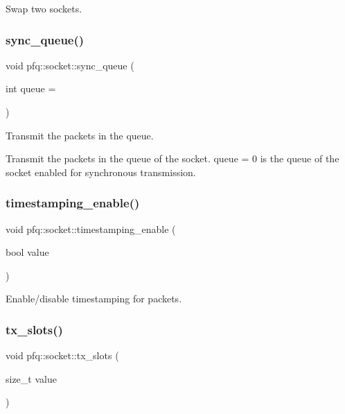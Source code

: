 Swap two sockets. 

\mbox{\label{classpfq_1_1socket_ab1739b5779cb85f3e7669883af892828}} 
\subsubsection{\texorpdfstring{sync\+\_\+queue()}{sync\_queue()}}
{\footnotesize\ttfamily void pfq\+::socket\+::sync\+\_\+queue (\begin{DoxyParamCaption}\item[{int}]{queue = {} }\end{DoxyParamCaption})\hspace{0.3cm}{\ttfamily [inline]}}



Transmit the packets in the queue. 

Transmit the packets in the queue of the socket. \textquotesingle{}queue = 0\textquotesingle{} is the queue of the socket enabled for synchronous transmission. \mbox{\label{classpfq_1_1socket_a39457556d11f22b1266abc8f9f7c46bd}} 
\subsubsection{\texorpdfstring{timestamping\+\_\+enable()}{timestamping\_enable()}}
{\footnotesize\ttfamily void pfq\+::socket\+::timestamping\+\_\+enable (\begin{DoxyParamCaption}\item[{bool}]{value }\end{DoxyParamCaption})\hspace{0.3cm}{\ttfamily [inline]}}



Enable/disable timestamping for packets. 

\mbox{\label{classpfq_1_1socket_a019d15a072c043d6a1333ca0c836da4c}} 
\subsubsection{\texorpdfstring{tx\+\_\+slots()}{tx\_slots()}\hspace{0.1cm}{\footnotesize\ttfamily [1/2]}}
{\footnotesize\ttfamily void pfq\+::socket\+::tx\+\_\+slots (\begin{DoxyParamCaption}\item[{size\+\_\+t}]{value }\end{DoxyParamCaption})\hspace{0.3cm}{\ttfamily [inline]}}



